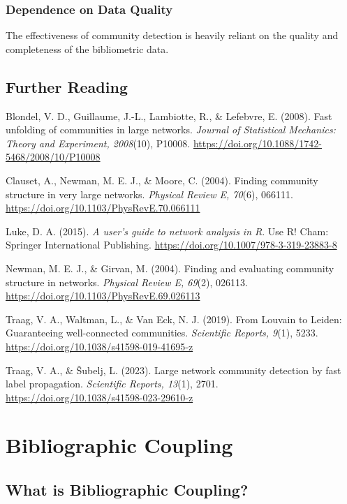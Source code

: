\documentclass[
  letterpaper,
]{scrreprt}
\begin{document}
\subsection{Dependence on Data
Quality}\label{dependence-on-data-quality}

The effectiveness of community detection is heavily reliant on the
quality and completeness of the bibliometric data.

\section{Further Reading}\label{further-reading-11}

Blondel, V. D., Guillaume, J.-L., Lambiotte, R., \& Lefebvre, E. (2008).
Fast unfolding of communities in large networks. \emph{Journal of
Statistical Mechanics: Theory and Experiment, 2008}(10), P10008.
\url{https://doi.org/10.1088/1742-5468/2008/10/P10008}

Clauset, A., Newman, M. E. J., \& Moore, C. (2004). Finding community
structure in very large networks. \emph{Physical Review E, 70}(6),
066111. \url{https://doi.org/10.1103/PhysRevE.70.066111}

Luke, D. A. (2015). \emph{A user's guide to network analysis in R}. Use
R! Cham: Springer International Publishing.
\url{https://doi.org/10.1007/978-3-319-23883-8}

Newman, M. E. J., \& Girvan, M. (2004). Finding and evaluating community
structure in networks. \emph{Physical Review E, 69}(2), 026113.
\url{https://doi.org/10.1103/PhysRevE.69.026113}

Traag, V. A., Waltman, L., \& Van Eck, N. J. (2019). From Louvain to
Leiden: Guaranteeing well-connected communities. \emph{Scientific
Reports, 9}(1), 5233. \url{https://doi.org/10.1038/s41598-019-41695-z}

Traag, V. A., \& Šubelj, L. (2023). Large network community detection by
fast label propagation. \emph{Scientific Reports, 13}(1), 2701.
\url{https://doi.org/10.1038/s41598-023-29610-z}

\chapter{Bibliographic Coupling}\label{bibliographic-coupling}

\section{What is Bibliographic
Coupling?}\label{what-is-bibliographic-coupling}
\end{document}
